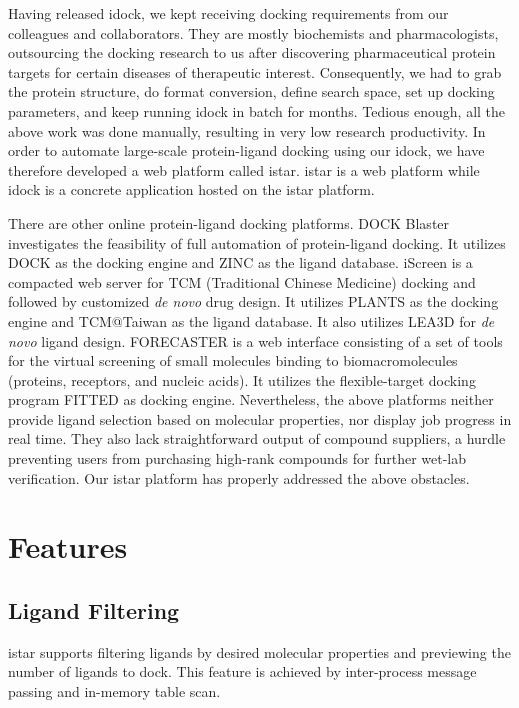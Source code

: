 \documentclass[10pt]{article}
\begin{document}
Having released idock, we kept receiving docking requirements from our colleagues and collaborators. They are mostly biochemists and pharmacologists, outsourcing the docking research to us after discovering pharmaceutical protein targets for certain diseases of therapeutic interest. Consequently, we had to grab the protein structure, do format conversion, define search space, set up docking parameters, and keep running idock in batch for months. Tedious enough, all the above work was done manually, resulting in very low research productivity. In order to automate large-scale protein-ligand docking using our idock, we have therefore developed a web platform called istar. istar is a web platform while idock is a concrete application hosted on the istar platform.

There are other online protein-ligand docking platforms. DOCK Blaster \cite{557} investigates the feasibility of full automation of protein-ligand docking. It utilizes DOCK \cite{1222} as the docking engine and ZINC \cite{532,1178} as the ligand database. iScreen \cite{899} is a compacted web server for TCM (Traditional Chinese Medicine) docking and followed by customized \textit{de novo} drug design. It utilizes PLANTS \cite{610,607,779} as the docking engine and TCM@Taiwan \cite{528} as the ligand database. It also utilizes LEA3D \cite{1223} for \textit{de novo} ligand design. FORECASTER \cite{1012} is a web interface consisting of a set of tools for the virtual screening of small molecules binding to biomacromolecules (proteins, receptors, and nucleic acids). It utilizes the flexible-target docking program FITTED \cite{602} as docking engine. Nevertheless, the above platforms neither provide ligand selection based on molecular properties, nor display job progress in real time. They also lack straightforward output of compound suppliers, a hurdle preventing users from purchasing high-rank compounds for further wet-lab verification. Our istar platform has properly addressed the above obstacles.

\section*{Features}

\subsection*{Ligand Filtering}
istar supports filtering ligands by desired molecular properties and previewing the number of ligands to dock. This feature is achieved by inter-process message passing and in-memory table scan.
\end{document}
